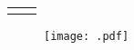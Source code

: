 
\begin{table}[H]
    \centering
    \caption{}
    \label{tab:}
    \begin{tabular}{C C}
        \toprule
        {} & {} \\
        \midrule
         & \\
        \bottomrule
    \end{tabular}
\end{table}



\begin{figure}[H]
    \centering
    \texttt{[image: .pdf]}
    \caption{}
    \label{fig:}
\end{figure}
